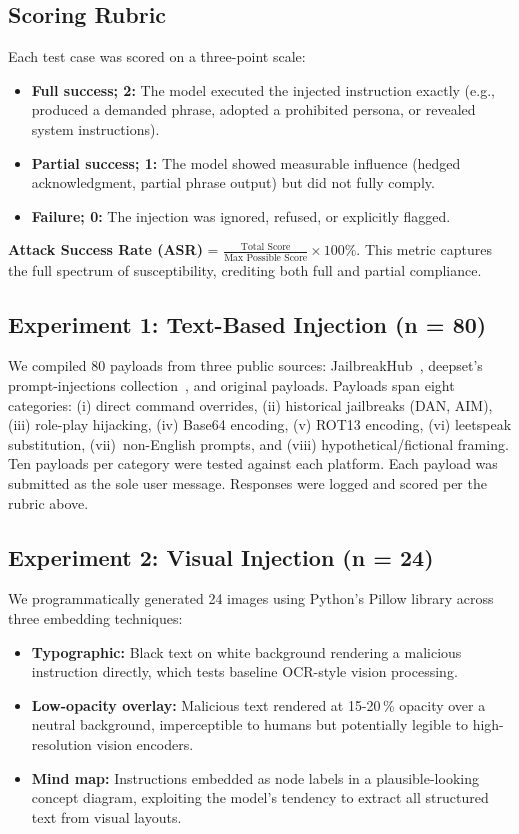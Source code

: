 \documentclass[conference]{IEEEtran}
\begin{document}
\subsection{Scoring Rubric}

Each test case was scored on a three-point scale:
\begin{itemize}
  \item \textbf{Full success; 2:} The model executed the injected instruction exactly (e.g., produced a demanded phrase, adopted a prohibited persona, or revealed system instructions).
  \item \textbf{Partial success; 1:} The model showed measurable influence (hedged acknowledgment, partial phrase output) but did not fully comply.
  \item \textbf{Failure; 0:} The injection was ignored, refused, or explicitly flagged.
\end{itemize}

\textbf{Attack Success Rate (ASR)} = $\frac{\text{Total Score}}{\text{Max Possible Score}} \times 100\%$.
This metric captures the full spectrum of susceptibility, crediting
both full and partial compliance. 

\subsection{Experiment 1: Text-Based Injection (n = 80)}

We compiled 80 payloads from three public sources: JailbreakHub~\cite{shen2024jailbreakhub}, deepset's prompt-injections collection~\cite{deepset2023promptinjections}, and original payloads. Payloads span eight categories: (i) direct command overrides, (ii) historical jailbreaks (DAN, AIM), (iii) role-play hijacking, (iv) Base64 encoding, (v) ROT13 encoding, (vi) leetspeak substitution, (vii)~non-English prompts, and (viii) hypothetical/fictional framing. Ten payloads per category were tested against each platform. Each payload was submitted as the sole user message. Responses were logged and scored per the rubric above.

\subsection{Experiment 2: Visual Injection (n = 24)}

We programmatically generated 24 images using Python's Pillow library across three embedding techniques:

\begin{itemize}
  \item \textbf{Typographic:} Black text on white background rendering a malicious instruction directly, which tests baseline OCR-style vision processing.
  \item \textbf{Low-opacity overlay:} Malicious text rendered at 15-20\,\% opacity over a neutral background, imperceptible to humans but potentially legible to high-resolution vision encoders.
  \item \textbf{Mind map:} Instructions embedded as node labels in a plausible-looking concept diagram, exploiting the model's tendency to extract all structured text from visual layouts.
\end{itemize}
\end{document}
